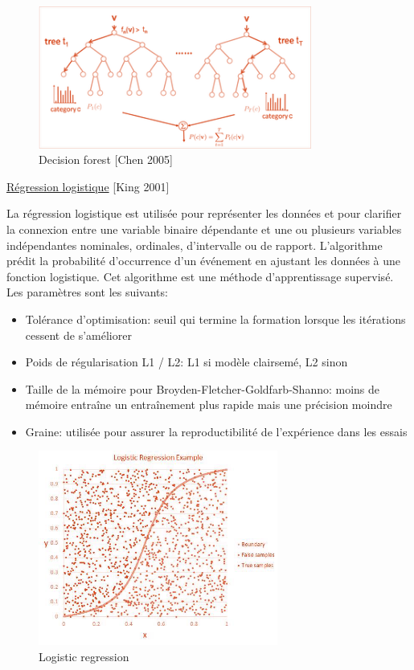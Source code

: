 \documentclass[12pt]{article}
\begin{document}
{\begin{figure}[H]
	\centering
    \includegraphics[width=0.8\textwidth]{image14.png}
     \caption{Decision forest [Chen 2005]}
    \label{fig:14}
\end{figure}


\underline{Régression logistique} {\color{red}[King 2001]}


La régression logistique est utilisée pour représenter les données et pour clarifier la connexion entre une variable binaire dépendante et une ou plusieurs variables indépendantes nominales, ordinales, d'intervalle ou de rapport. L'algorithme prédit la probabilité d'occurrence d'un événement en ajustant les données à une fonction logistique.
Cet algorithme est une méthode d'apprentissage supervisé.
Les paramètres sont les suivants:
\begin{itemize}
\item Tolérance d'optimisation: seuil qui termine la formation lorsque les itérations cessent de s'améliorer
\item Poids de régularisation L1 / L2: L1 si modèle clairsemé, L2 sinon
\item Taille de la mémoire pour Broyden-Fletcher-Goldfarb-Shanno: moins de mémoire entraîne un entraînement plus rapide mais une précision moindre
\item Graine: utilisée pour assurer la reproductibilité de l'expérience dans les essais
\end{itemize}


\begin{figure}[H]
	\centering
    \includegraphics[width=0.7\textwidth]{image15.png}
     \caption{Logistic regression}
    \label{fig:15}
\end{figure}

}
\end{document}
